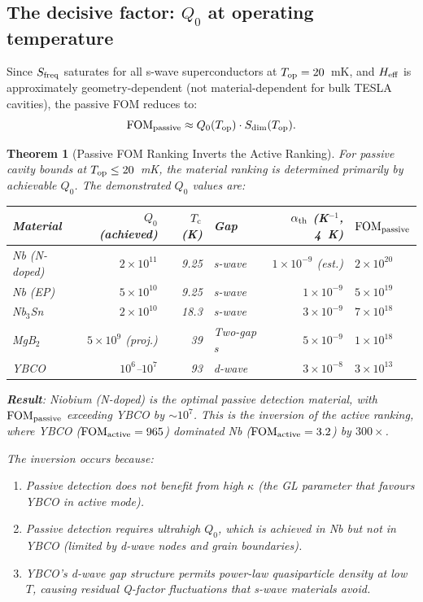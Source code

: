 \documentclass[11pt]{article}
\newtheorem{theorem}{Theorem}[section]
\theoremstyle{definition}
\theoremstyle{remark}
\newcommand{\ee}[1]{\times 10^{#1}}
\newcommand{\Tc}{T_{\rm c}}
\newcommand{\FOMactive}{\mathrm{FOM}_{\rm active}}
\newcommand{\FOMpassive}{\mathrm{FOM}_{\rm passive}}
\newcommand{\Heff}{H_{\rm eff}}
\begin{document}
\subsection{The decisive factor: $Q_0$ at operating temperature}

Since $S_{\rm freq}$ saturates for all s-wave superconductors at
$T_{\rm op} = 20$~mK, and $\Heff$ is approximately geometry-dependent
(not material-dependent for bulk TESLA cavities), the passive FOM
reduces to:
\begin{equation}
  \FOMpassive \approx Q_0(T_{\rm op}) \cdot S_{\rm dim}(T_{\rm op}).
  \label{eq:FOM_passive_simplified}
\end{equation}

\begin{theorem}[Passive FOM Ranking Inverts the Active Ranking]
\label{thm:passive_inversion}
For passive cavity bounds at $T_{\rm op} \leq 20$~mK, the material
ranking is determined primarily by achievable $Q_0$. The demonstrated
$Q_0$ values are:

\begin{center}
\renewcommand{\arraystretch}{1.3}
\begin{tabular}{lrrlrl}
\toprule
Material & $Q_0$ (achieved) & $\Tc$ (K) & Gap & $\alpha_{\rm th}$ (K$^{-1}$, 4~K)
  & $\FOMpassive$ \\
\midrule
Nb (N-doped) & $2\ee{11}$ & 9.25 & s-wave & $1\ee{-9}$ (est.)
  & \textbf{$2\ee{20}$} \\
Nb (EP) & $5\ee{10}$ & 9.25 & s-wave & $1\ee{-9}$
  & $5\ee{19}$ \\
Nb$_3$Sn & $2\ee{10}$ & 18.3 & s-wave & $3\ee{-9}$
  & $7\ee{18}$ \\
MgB$_2$ & $5\ee{9}$ (proj.) & 39 & Two-gap s & $5\ee{-9}$
  & $1\ee{18}$ \\
YBCO & $10^{6}$--$10^{7}$ & 93 & d-wave & $3\ee{-8}$
  & $3\ee{13}$ \\
\bottomrule
\end{tabular}
\end{center}

\textbf{Result}: Niobium (N-doped) is the optimal passive detection
material, with $\FOMpassive$ exceeding YBCO by $\sim 10^7$. This is
the \emph{inversion} of the active ranking, where YBCO ($\FOMactive = 965$)
dominated Nb ($\FOMactive = 3.2$) by $300\times$.

The inversion occurs because:
\begin{enumerate}[nosep]
  \item Passive detection does not benefit from high $\kappa$ (the
    GL parameter that favours YBCO in active mode).
  \item Passive detection requires ultrahigh $Q_0$, which is achieved
    in Nb but not in YBCO (limited by d-wave nodes and grain boundaries).
  \item YBCO's d-wave gap structure permits power-law quasiparticle
    density at low $T$, causing residual Q-factor fluctuations that
    s-wave materials avoid.
\end{enumerate}
\end{theorem}
\end{document}
